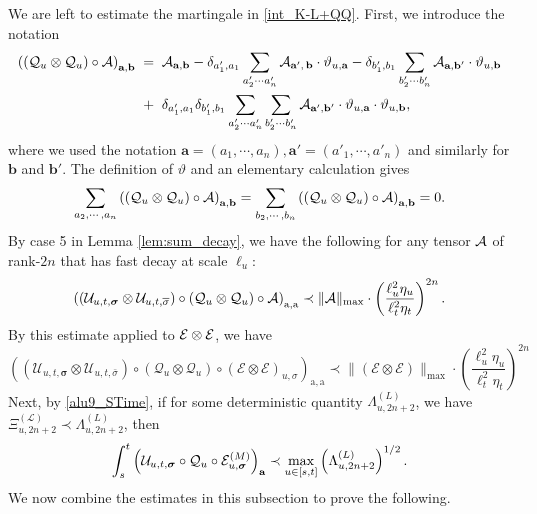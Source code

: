 We are left to estimate the martingale in \eqref{int_K-L+QQ}. First, we introduce the notation
\begin{align}
\left(\left( \mathcal{Q} _u\otimes \mathcal{Q}_u \right)\circ {\cal A}\right)_{\textbf{a}, \textbf{b}} 
 \;=\; & \; 
{\cal A }_{\textbf{a}, \textbf{b} }-
\delta_{a_1', a_1}\sum_{a_2'\cdots a_n'}{\cal A }_{ \textbf{a}' , \,\textbf{b}}\cdot \vartheta_{u, \textbf{a}}
-\delta_{b_1', b_1}
\sum_{b_2'\cdots b_n'}{\cal A }_{\textbf{a}, \textbf{b}'}\cdot \vartheta_{u, \textbf{b} }
\nonumber \\ \;+\; & \; 
\delta_{a_1', a_1}
\delta_{b_1', b_1}
\sum_{a'_2\cdots a'_n}\sum_{b_2'\cdots b_n'}{\cal A }_{\textbf{a}', \textbf{b}'}\cdot \vartheta_{u, \textbf{a}}\cdot \vartheta_{u, \textbf{b}}  , 
\end{align}
where we used the notation
$
\textbf{a}=(a_1,\cdots, a_n), \textbf{a}'=(a'_1,\cdots, a'_n)$ and similarly for 
 $\textbf{b}$ and $\textbf{b}'$. The definition of  $\vartheta$ and an elementary calculation gives 
$$
\sum_{a_2,\cdots,a_n} \left(\left( \mathcal{Q} _u\otimes \mathcal{Q}_u \right)\circ {\cal A}\right)_{\textbf{a}, \textbf{b}}=\sum_{b_2,\cdots,b_n} \left(\left( \mathcal{Q} _u\otimes \mathcal{Q}_u \right)\circ {\cal A}\right)_{\textbf{a}, \textbf{b}}=0.
$$
By case 5 in Lemma \ref{lem:sum_decay}, we have the following for any tensor ${\cal A}$ of rank-$2n$ that has fast decay at scale $\ell_{u}$: 
$$
\left(\left(\mathcal{U}_{u, t, \boldsymbol{\sigma}} \otimes \mathcal{U}_{u, t, \bar{\sigma}}\right) \circ\left(\mathcal{Q}_u \otimes \mathcal{Q}_u\right) \circ {\cal A}\right)_{\mathrm{a}, \mathrm{a}} \prec \|{\cal A}\|_{\max}\cdot \left(\frac{\ell^2_u\eta_u}{\ell^2_t\eta_t}\right)^{2n}.
$$
By this estimate applied to ${\cal E}\otimes{\cal E}$, we have
$$
\left(\left(\mathcal{U}_{u, t, \boldsymbol{\sigma}} \otimes \mathcal{U}_{u, t, \bar{\sigma}}\right) \circ\left(\mathcal{Q}_u \otimes \mathcal{Q}_u\right) \circ(\mathcal{E} \otimes \mathcal{E})_{u, \sigma}\right)_{\mathrm{a}, \mathrm{a}} \prec \|(\mathcal{E} \otimes \mathcal{E})\|_{\max} \cdot \left(\frac{\ell^2_u\eta_u}{\ell^2_t\eta_t}\right)^{2n}
$$
Next, by \eqref{alu9_STime}, if for some deterministic quantity $\Lambda^{(L)}_{u, 2n+2}$, we have 
$ \Xi_{u, 2 n+2}^{(\mathcal{L})} \prec\Lambda^{(L)}_{u, 2n+2}$, then
\begin{equation}\label{uwyu92osk}
    \int_{s}^t \left(\mathcal{U}_{u, t, \boldsymbol{\sigma}} \circ  {\cal Q}_u\circ \mathcal{E}^{(M)}_{u, \boldsymbol{\sigma}}\right)_{\textbf{a}}\prec \max_{u\in [s,t]} \left(\Lambda^{(L)}_{u, 2n+2}\right)^{1/2}.
\end{equation}
 We now combine the estimates in this subsection to prove the following.


